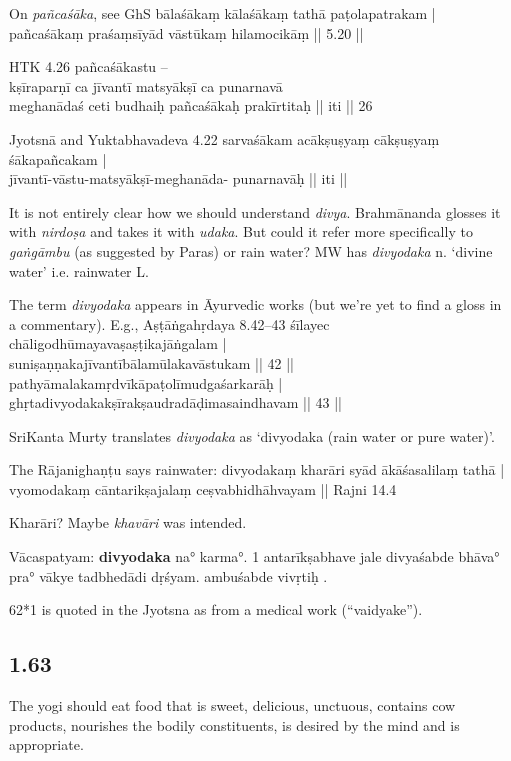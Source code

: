 \begin{ekdosis}
\begin{philcomm}[hp01_062]
On \emph{pañcaśāka}, see GhS
\startverse
bālaśākaṃ kālaśākaṃ tathā paṭolapatrakam |\\
pañcaśākaṃ praśaṃsīyād vāstūkaṃ hilamocikāṃ || 5.20 ||
\endverse

HTK 4.26
\startverse
pañcaśākastu –\\
kṣīraparṇī ca jīvantī matsyākṣī ca punarnavā \\
meghanādaś ceti budhaiḥ pañcaśākaḥ prakīrtitaḥ || iti || 26
\endverse

Jyotsnā and Yuktabhavadeva 4.22
\startverse
sarvaśākam acākṣuṣyaṃ cākṣuṣyaṃ śākapañcakam |\\
jīvantī-vāstu-matsyākṣī-meghanāda- punarnavāḥ || iti ||
\endverse

It is not entirely clear how we should understand \emph{divya}. Brahmānanda glosses it with \emph{nirdoṣa} and takes it with \emph{udaka}. But could it refer more specifically to \emph{gaṅgāmbu} (as suggested by Paras) or rain water? MW has \emph{divyodaka} n. `divine water' i.e. rainwater L.

The term \emph{divyodaka} appears in Āyurvedic works (but we’re yet to find a gloss in a commentary). E.g.,
Aṣṭāṅgahṛdaya 8.42–43
\startverse
śīlayec chāligodhūmayavaṣaṣṭikajāṅgalam |\\
suniṣaṇṇakajīvantībālamūlakavāstukam || 42 ||\\
pathyāmalakamṛdvīkāpaṭolīmudgaśarkarāḥ |\\
ghṛtadivyodakakṣīrakṣaudradāḍimasaindhavam || 43 ||
\endverse

SriKanta Murty translates \emph{divyodaka} as ‘divyodaka (rain water or pure water)'.

The Rājanighaṇṭu says rainwater:
\startverse
divyodakaṃ kharāri syād ākāśasalilaṃ tathā |\\
vyomodakaṃ cāntarikṣajalaṃ ceṣvabhidhāhvayam || Rajni 14.4
\endverse

Kharāri? Maybe \emph{khavāri} was intended.

Vācaspatyam:
\textbf{divyodaka} na° karma°.
1 antarīkṣabhave jale divyaśabde bhāva° pra° vākye tadbhedādi dṛśyam.
ambuśabde vivṛtiḥ .

62*1 is quoted in the Jyotsna as from a medical work (“vaidyake”).
\end{philcomm}

\subsection*{1.63}
\begin{translation}[hp01_063]
The yogi should eat food that is sweet, delicious, unctuous, contains cow products, nourishes the bodily constituents, is desired by the mind and is appropriate.
\end{translation}


\end{ekdosis}
